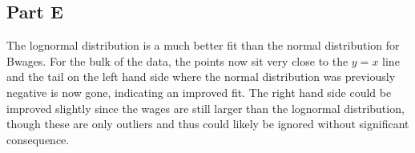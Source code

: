 \documentclass[letterpaper]{article}
\begin{document}
\subsection*{Part E}

The lognormal distribution is a much better fit than the normal distribution for Bwages. For the bulk of the data, the points now sit very close to the $y = x$ line and the tail on the left hand side where the normal distribution was previously negative is now gone, indicating an improved fit. The right hand side could be improved slightly since the wages are still larger than the lognormal distribution, though these are only outliers and thus could likely be ignored without significant consequence.
\end{document}
